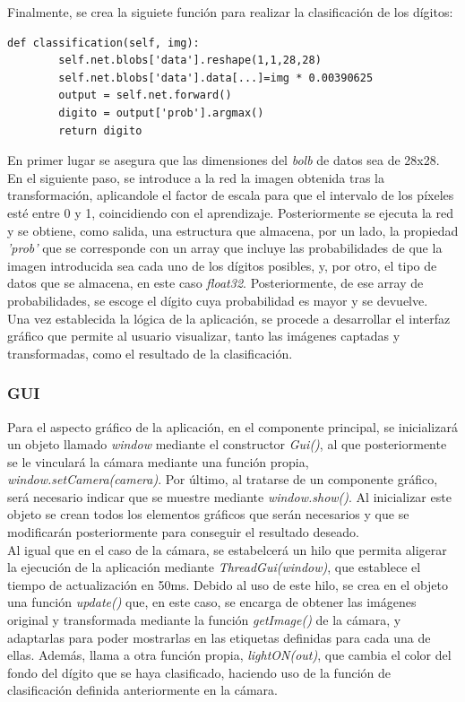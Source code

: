 Finalmente, se crea la siguiete función para realizar la clasificación de los dígitos:
\vspace{10pt}
\begin{lstlisting}[frame=single]
	def classification(self, img):
		self.net.blobs['data'].reshape(1,1,28,28)
		self.net.blobs['data'].data[...]=img * 0.00390625
		output = self.net.forward()
		digito = output['prob'].argmax()
		return digito
\end{lstlisting}

En primer lugar se asegura que las dimensiones del \textit{bolb} de datos sea de 28x28. En el siguiente paso, se introduce a la red la imagen obtenida tras la transformación, aplicandole el factor de escala para que el intervalo de los píxeles esté entre 0 y 1, coincidiendo con el aprendizaje. Posteriormente se ejecuta la red y se obtiene, como salida, una estructura que almacena, por un lado, la propiedad \textit{'prob'} que se corresponde con un array que incluye las probabilidades de que la imagen introducida sea cada uno de los dígitos posibles, y, por otro, el tipo de datos que se almacena, en este caso \textit{float32}. Posteriormente, de ese array de probabilidades, se escoge el dígito cuya probabilidad es mayor y se devuelve.\\

Una vez establecida la lógica de la aplicación, se procede a desarrollar el interfaz gráfico que permite al usuario visualizar, tanto las imágenes captadas y transformadas, como el resultado de la clasificación.

\subsubsection{GUI}
Para el aspecto gráfico de la aplicación, en el componente principal, se inicializará un objeto llamado \textit{window} mediante el constructor \textit{Gui()}, al que posteriormente se le vinculará la cámara mediante una función propia, \textit{window.setCamera(camera)}. Por último, al tratarse de un componente gráfico, será necesario indicar que se muestre mediante \textit{window.show()}. Al inicializar este objeto se crean todos los elementos gráficos que serán necesarios y que se modificarán posteriormente para conseguir el resultado deseado.\\

Al igual que en el caso de la cámara, se estabelcerá un hilo que permita aligerar la ejecución de la aplicación mediante \textit{ThreadGui(window)}, que establece el tiempo de actualización en 50ms. Debido al uso de este hilo, se crea en el objeto una función \textit{update()} que, en este caso, se encarga de obtener las imágenes original y transformada mediante la función \textit{getImage()} de la cámara, y adaptarlas para poder mostrarlas en las etiquetas definidas para cada una de ellas. Además, llama a otra función propia, \textit{lightON(out)}, que cambia el color del fondo del dígito que se haya clasificado, haciendo uso de la función de clasificación definida anteriormente en la cámara.\\

